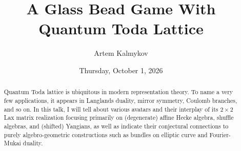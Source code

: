 \documentclass{UAmathtalk}
\author{Artem Kalmykov}
\title{A Glass Bead Game With Quantum Toda Lattice}
\date{Thursday, October 1, 2026}
\begin{document}
\maketitle

\begin{abstract}
Quantum Toda lattice is ubiquitous in modern representation theory. To name a very few applications, it appears in Langlands duality, mirror symmetry, Coulomb branches, and so on. In this talk, I will tell about various avatars and their interplay of its $2\times2$ Lax matrix realization focusing primarily on (degenerate) affine Hecke algebra, shuffle algebras, and (shifted) Yangians, as well as indicate their conjectural connections to purely algebro-geometric constructions such as bundles on elliptic curve and Fourier-Mukai duality.
\end{abstract}
\end{document}
